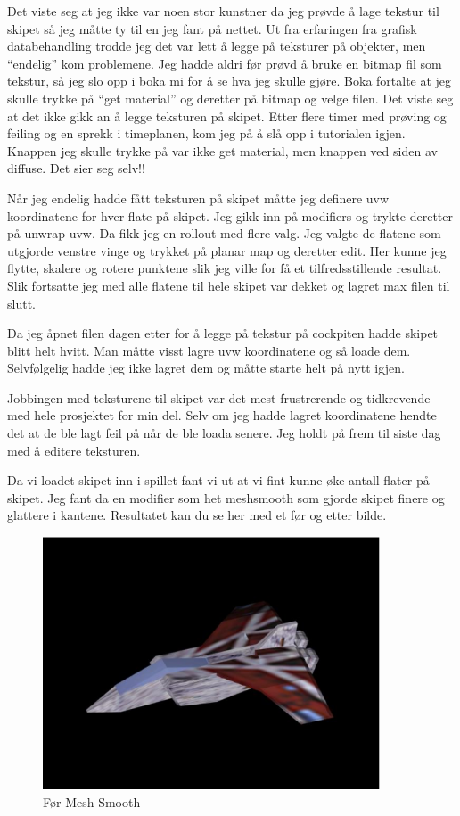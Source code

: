 \documentclass[11pt, dvips]{report}
\begin{document}
Det viste seg at jeg ikke var noen stor kunstner da jeg prøvde å lage
tekstur til skipet så jeg måtte ty til en jeg fant på nettet. Ut fra
erfaringen fra grafisk databehandling trodde jeg det var lett å legge
på teksturer på objekter, men ``endelig'' kom problemene. Jeg hadde
aldri før prøvd å bruke en bitmap fil som tekstur, så jeg slo opp i
boka mi for å se hva jeg skulle gjøre. Boka fortalte at jeg skulle
trykke på ``get material'' og deretter på bitmap og velge filen.  Det
viste seg at det ikke gikk an å legge teksturen på skipet. Etter flere
timer med prøving og feiling og en sprekk i timeplanen, kom jeg på å
slå opp i tutorialen igjen. Knappen jeg skulle trykke på var ikke get
material, men knappen ved siden av diffuse. Det sier seg selv!!

Når jeg endelig hadde fått teksturen på skipet måtte jeg definere uvw
koordinatene for hver flate på skipet.  Jeg gikk inn på modifiers og
trykte deretter på unwrap uvw. Da fikk jeg en rollout med flere valg.
Jeg valgte de flatene som utgjorde venstre vinge og trykket på planar
map og deretter edit. Her kunne jeg flytte, skalere og rotere punktene
slik jeg ville for få et tilfredsstillende resultat. Slik fortsatte
jeg med alle flatene til hele skipet var dekket og lagret max filen
til slutt.

Da jeg åpnet filen dagen etter for å legge på tekstur på cockpiten
hadde skipet blitt helt hvitt. Man måtte visst lagre uvw koordinatene
og så loade dem. Selvfølgelig hadde jeg ikke lagret dem og måtte
starte helt på nytt igjen.

Jobbingen med teksturene til skipet var det mest frustrerende og
tidkrevende med hele prosjektet for min del. Selv om jeg hadde lagret
koordinatene hendte det at de ble lagt feil på når de ble loada
senere. Jeg holdt på frem til siste dag med å editere teksturen.

Da vi loadet skipet inn i spillet fant vi ut at vi fint kunne øke
antall flater på skipet. Jeg fant da en modifier som het meshsmooth
som gjorde skipet finere og glattere i kantene.  Resultatet kan du se
her med et før og etter bilde.

\begin{figure}[hbtp!]
\center\includegraphics[width=10cm]{image001.eps}
\caption{Før Mesh Smooth}
\end{figure}
\end{document}
